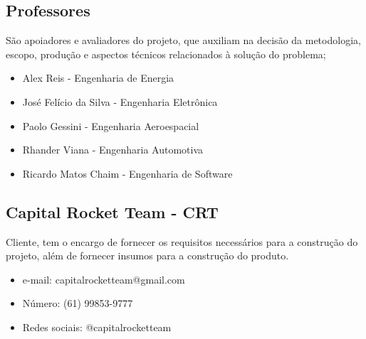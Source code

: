 \subsection{Professores} São apoiadores e avaliadores do projeto, que auxiliam na decisão da metodologia, escopo, produção e aspectos técnicos relacionados à solução do problema;

\begin{itemize}
    \item Alex Reis - Engenharia de Energia
    \item José Felício da Silva - Engenharia Eletrônica
    \item Paolo Gessini - Engenharia Aeroespacial
    \item Rhander Viana - Engenharia Automotiva
    \item Ricardo Matos Chaim - Engenharia de Software
\end{itemize}
    
\subsection{Capital Rocket Team - CRT} Cliente, tem o encargo de fornecer os requisitos necessários para a construção do projeto, além de fornecer  insumos para a construção do produto.

\begin{itemize}
    \item e-mail: capitalrocketteam@gmail.com
    \item Número: (61) 99853-9777
    \item Redes sociais: @capitalrocketteam
\end{itemize}
